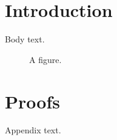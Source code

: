 \documentclass[11pt]{stdderiv}
\begin{document}
\section{Introduction}
Body text.
\begin{figure}[h]
\caption{A figure.}
\end{figure}
\begin{table}[h]
\caption{A table.}
\end{table}
\appendix
\section{Proofs}
Appendix text.
\end{document}

